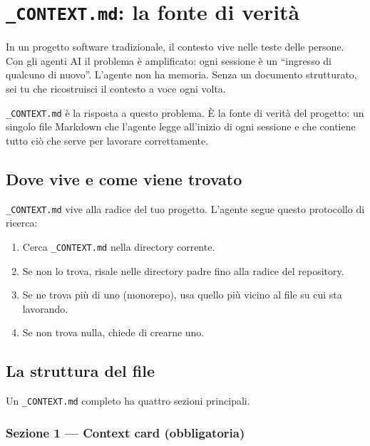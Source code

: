 ﻿%

\chapter{\texttt{\_CONTEXT.md}: la fonte di verità}
\label{ch:context-md}

In un progetto software tradizionale, il contesto vive nelle teste delle persone. Con gli agenti AI il problema è amplificato: ogni sessione è un ``ingresso di qualcuno di nuovo''. L'agente non ha memoria. Senza un documento strutturato, sei tu che ricostruisci il contesto a voce ogni volta.

\texttt{\_CONTEXT.md} è la risposta a questo problema. È la fonte di verità del progetto: un singolo file Markdown che l'agente legge all'inizio di ogni sessione e che contiene tutto ciò che serve per lavorare correttamente.

\section{Dove vive e come viene trovato}
\label{sec:04-dove-vive}

\texttt{\_CONTEXT.md} vive alla radice del tuo progetto. L'agente segue questo protocollo di ricerca:

\begin{enumerate}
  \item Cerca \texttt{\_CONTEXT.md} nella directory corrente.
  \item Se non lo trova, risale nelle directory padre fino alla radice del repository.
  \item Se ne trova più di uno (monorepo), usa quello più vicino al file su cui sta lavorando.
  \item Se non trova nulla, chiede di crearne uno.
\end{enumerate}

\section{La struttura del file}
\label{sec:04-struttura}

Un \texttt{\_CONTEXT.md} completo ha quattro sezioni principali.

\subsection*{Sezione 1 --- Context card (obbligatoria)}

